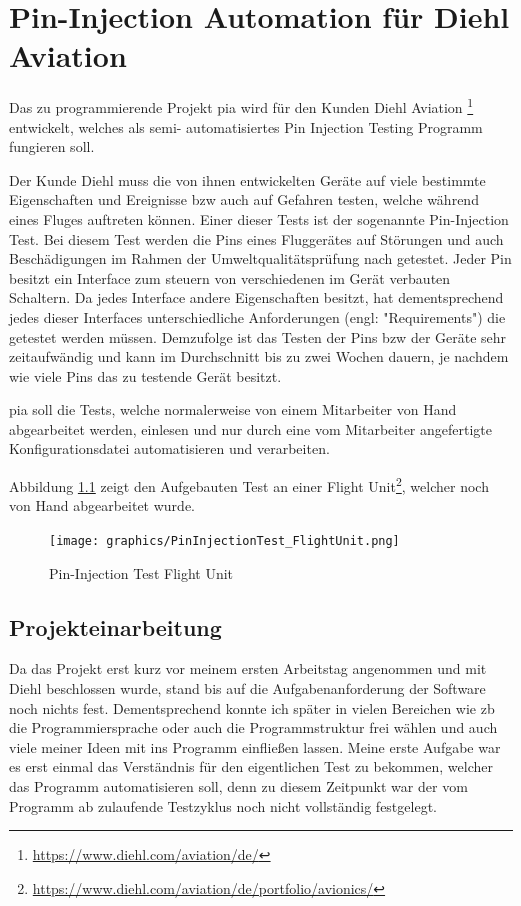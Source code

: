 \chapter{Pin-Injection Automation für Diehl Aviation}
\label{ch:pia}

Das zu programmierende Projekt \ac{pia} wird für den Kunden Diehl Aviation
\footnote{\url{https://www.diehl.com/aviation/de/}} entwickelt, welches als semi-
automatisiertes Pin Injection Testing Programm fungieren soll.

Der Kunde Diehl muss die von ihnen entwickelten Geräte auf viele bestimmte Eigenschaften und
Ereignisse \ac{bzw} auch auf Gefahren testen, welche während eines Fluges auftreten können.
Einer dieser Tests ist der sogenannte Pin-Injection Test.
Bei diesem Test werden die Pins eines Fluggerätes auf Störungen und auch Beschädigungen im
Rahmen der Umweltqualitätsprüfung nach  getestet. Jeder Pin besitzt ein Interface
zum steuern von verschiedenen im Gerät verbauten Schaltern. Da jedes Interface andere
Eigenschaften besitzt, hat dementsprechend jedes dieser Interfaces unterschiedliche
Anforderungen (engl: "Requirements") die getestet werden müssen.
Demzufolge ist das Testen der Pins \ac{bzw} der Geräte sehr zeitaufwändig und kann im
Durchschnitt bis zu zwei Wochen dauern, je nachdem wie viele Pins das zu testende Gerät
besitzt.

\ac{pia} soll die Tests, welche normalerweise von einem Mitarbeiter von Hand abgearbeitet
werden, einlesen und nur durch eine vom Mitarbeiter angefertigte Konfigurationsdatei
automatisieren und verarbeiten.

\pagebreak
Abbildung \ref{fig:flight_unit} zeigt den Aufgebauten Test an einer Flight Unit\footnote{\url{https://www.diehl.com/aviation/de/portfolio/avionics/}}, welcher noch von Hand abgearbeitet wurde.

\begin{figure}[H]
	\centering
	\texttt{[image: graphics/PinInjectionTest\_FlightUnit.png]}
	\caption{Pin-Injection Test Flight Unit}
	\label{fig:flight_unit}
\end{figure}


\section{Projekteinarbeitung}
\label{sec:prj-einarbeitung}

Da das Projekt erst kurz vor meinem ersten Arbeitstag angenommen und mit Diehl beschlossen
wurde, stand bis auf die Aufgabenanforderung der Software noch nichts fest. Dementsprechend
konnte ich später in vielen Bereichen wie \ac{zb} die Programmiersprache oder auch die
Programmstruktur frei wählen und auch viele meiner Ideen mit ins Programm einfließen lassen.
Meine erste Aufgabe war es erst einmal das Verständnis für den eigentlichen Test zu bekommen,
welcher das Programm automatisieren soll, denn zu diesem Zeitpunkt war der vom Programm
ab zulaufende Testzyklus noch nicht vollständig festgelegt. 


